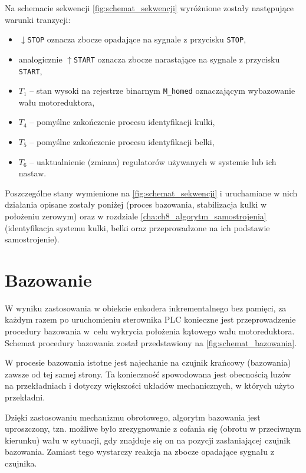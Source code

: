 Na schemacie sekwencji \cref{fig:schemat_sekwencji} wyróżnione zostały następujące warunki tranzycji:
\begin{itemize}
    \item $\downarrow$\texttt{STOP} oznacza zbocze opadające na sygnale z przycisku \texttt{STOP},
    \item analogicznie $\uparrow$\texttt{START} oznacza zbocze narastające na sygnale z przycisku \texttt{START},
    \item $T_1$ -- stan wysoki na rejestrze binarnym \texttt{M\_homed} oznaczającym wybazowanie wału motoreduktora,
    \item $T_4$ -- pomyślne zakończenie procesu identyfikacji kulki,
    \item $T_5$ -- pomyślne zakończenie procesu identyfikacji belki,
    \item $T_6$ -- uaktualnienie (zmiana) regulatorów używanych w systemie lub ich nastaw.
\end{itemize}

Poszczególne stany wymienione na \cref{fig:schemat_sekwencji} i uruchamiane w nich działania opisane zostały poniżej (proces bazowania, stabilizacja kulki w położeniu zerowym) oraz w rozdziale \ref{cha:ch8_algorytm_samostrojenia} (identyfikacja systemu kulki, belki oraz przeprowadzone na ich podstawie samostrojenie).

\section{Bazowanie}
\label{sec:ch7_bazowanie}

W wyniku zastosowania w obiekcie enkodera inkrementalnego bez pamięci, za każdym razem po uruchomieniu sterownika PLC konieczne jest przeprowadzenie procedury bazowania w~celu wykrycia położenia kątowego wału motoreduktora. Schemat procedury bazowania został przedstawiony na \cref{fig:schemat_bazowania}.

W procesie bazowania istotne jest najechanie na czujnik krańcowy (bazowania) zawsze od tej samej strony. Ta konieczność spowodowana jest obecnością luzów na przekładniach i dotyczy większości układów mechanicznych, w których użyto przekładni.

Dzięki zastosowaniu mechanizmu obrotowego, algorytm bazowania jest uproszczony, tzn. możliwe było zrezygnowanie z cofania się (obrotu w przeciwnym kierunku) wału w sytuacji, gdy znajduje się on na pozycji zasłaniającej czujnik bazowania. Zamiast tego wystarczy reakcja na zbocze opadające sygnału z czujnika.

